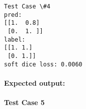\documentclass[11pt]{article}
\newenvironment{Shaded}{}{}
\newcommand{\FloatTok}[1]{\textcolor[rgb]{0.25,0.63,0.44}{{#1}}}
\newcommand{\CommentTok}[1]{\textcolor[rgb]{0.38,0.63,0.69}{\textit{{#1}}}}
\newcommand{\NormalTok}[1]{{#1}}
\begin{document}
    \begin{Verbatim}[commandchars=\\\{\}]
Test Case \#4
pred:
[[1.  0.8]
 [0.  1. ]]
label:
[[1. 1.]
 [0. 1.]]
soft dice loss: 0.0060

    \end{Verbatim}

    \hypertarget{expected-output}{%
\paragraph{Expected output:}\label{expected-output}}

\begin{Shaded}
\end{Shaded}

    \hypertarget{test-case-5}{%
\paragraph{Test Case 5}\label{test-case-5}}
\end{document}
